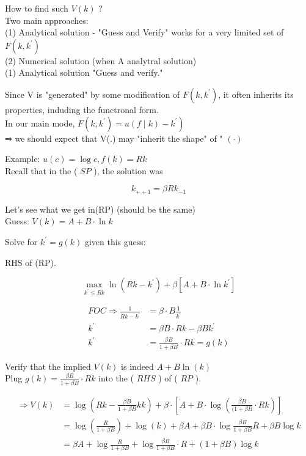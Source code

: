 \documentclass[10pt]{article}
\begin{document}
How to find such $V(k)$ ?\\
Two main approaches:\\
(1) Analytical solution - "Guess and Verify" works for a very limited set of $F\left(k, k^{\prime}\right)$\\
(2) Numerical solution (when A analytral solution)\\
(1) Analytical solution "Guess and verify."

Since V is "generated" by some modification of $F\left(k, k^{\prime}\right)$, it often inherits its properties, induding the functronal form.\\
In our main mode, $\left.F\left(k, k^{\prime}\right)=u(f \mid k)-k^{\prime}\right)$\\
⇒ we should expect that V(.) may "inherit the shape" of " $(\cdot)$

Example: $u(c)=\log c, f(k)=R k$\\
Recall that in the ( $S P$ ), the solution was

$$
k_{++1}=\beta R k_{-1}
$$

Let's see what we get in(RP) (should be the same)\\
Guess: $V(k)=A+B \cdot \ln k$

Solve for $k^{\prime}=g(k)$ given this guess:

RHS of (RP).

$$
\max _{k^{\prime} \leqslant R k} \ln \left(R k-k^{\prime}\right)+\beta\left[A+B \cdot \ln k^{\prime}\right]
$$

$$
\begin{aligned}
F O C \Rightarrow \frac{1}{R k-k^{\prime}} & =\beta \cdot B \frac{1}{k^{\prime}} \\
k^{\prime} & =\beta B \cdot R k-\beta B k^{\prime} \\
k^{\prime} & =\frac{\beta B}{1+\beta B} \cdot R k=g(k)
\end{aligned}
$$

Verify that the implied $V(k)$ is indeed $A+B \ln (k)$\\
Plug $g(k)=\frac{\beta B}{1+\beta B} \cdot R k$ into the ( $R H S$ ) of ( $R P$ ).

$$
\begin{aligned}
\Rightarrow V(k) & =\log \left(R k-\frac{\beta B}{1+\beta B} k k\right)+\beta \cdot\left[A+B \cdot \log \left(\frac{\beta B}{(1+\beta B} \cdot R k\right)\right] \\
& =\log \left(\frac{R}{1+\beta B}\right)+\log (k)+\beta A+\beta B \cdot \log \frac{\beta B}{1+\beta B} R+\beta B \log k \\
& =\beta A+\log \frac{R}{1+\beta B}+\log \frac{\beta B}{1+\beta B} \cdot R+(1+\beta B) \log k
\end{aligned}
$$
\end{document}
